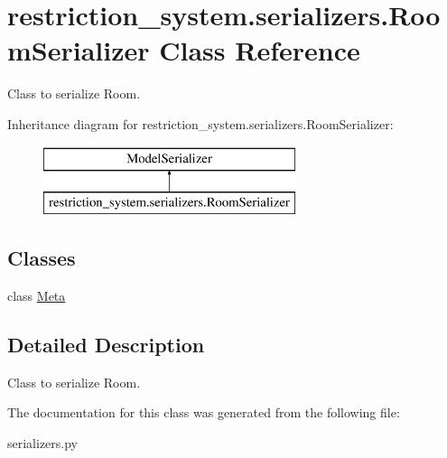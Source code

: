 \hypertarget{classrestriction__system_1_1serializers_1_1RoomSerializer}{}\section{restriction\+\_\+system.\+serializers.\+Room\+Serializer Class Reference}
\label{classrestriction__system_1_1serializers_1_1RoomSerializer}


Class to serialize Room.  


Inheritance diagram for restriction\+\_\+system.\+serializers.\+Room\+Serializer\+:\begin{figure}[H]
\begin{center}
\leavevmode
\includegraphics[height=2.000000cm]{classrestriction__system_1_1serializers_1_1RoomSerializer}
\end{center}
\end{figure}
\subsection*{Classes}
\begin{DoxyCompactItemize}
\item 
class \hyperlink{classrestriction__system_1_1serializers_1_1RoomSerializer_1_1Meta}{Meta}
\end{DoxyCompactItemize}


\subsection{Detailed Description}
Class to serialize Room. 

The documentation for this class was generated from the following file\+:\begin{DoxyCompactItemize}
\item 
serializers.\+py\end{DoxyCompactItemize}
